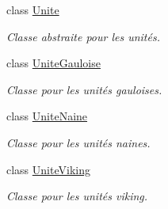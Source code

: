 \begin{DoxyCompactItemize}
class \hyperlink{class_small_world_1_1_unite}{Unite}
\begin{DoxyCompactList}\small\item\em Classe abstraite pour les unités. \end{DoxyCompactList}\item 
class \hyperlink{class_small_world_1_1_unite_gauloise}{Unite\-Gauloise}
\begin{DoxyCompactList}\small\item\em Classe pour les unités gauloises. \end{DoxyCompactList}\item 
class \hyperlink{class_small_world_1_1_unite_naine}{Unite\-Naine}
\begin{DoxyCompactList}\small\item\em Classe pour les unités naines. \end{DoxyCompactList}\item 
class \hyperlink{class_small_world_1_1_unite_viking}{Unite\-Viking}
\begin{DoxyCompactList}\small\item\em Classe pour les unités viking. \end{DoxyCompactList}\end{DoxyCompactItemize}
